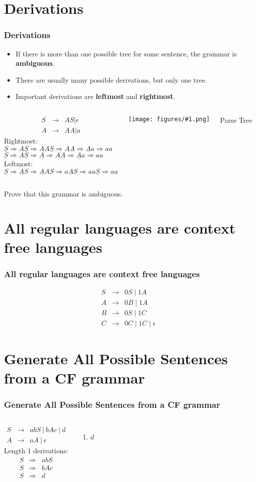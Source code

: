 \documentclass{beamer}
\newcommand{\myfig}[1]{\centerline{\texttt{[image: figures/\#1.png]}}}
\newcommand{\arr}{&\rightarrow&}
\newcommand{\darr}{&\Rightarrow&}
\newcommand{\dar}{\Rightarrow}
\newcommand{\bee}{\begin{eqnarray*}}
\newcommand{\eee}{\end{eqnarray*}}
\newcommand{\emptystring}{\ensuremath{\epsilon}}
\newcommand{\bi}{\begin{itemize}}
\newcommand{\li}{\item}
\newcommand{\ei}{\end{itemize}}
\newcommand{\sect}[1]{
\section{#1}
\begin{frame}[fragile]\frametitle{#1}
}
\begin{document}
\newcommand{\ul}[1]{\underline{#1}}
\sect{Derivations}
\bi
\li If there is more than one possible tree for some sentence, 
the grammar is {\bf ambiguous}.
\li There are usually many possible derivations, but only one tree.
\li Important derivations are {\bf leftmost} and {\bf rightmost}.
\ei
\begin{columns}
\bee
S \arr AS | \emptystring \\
A \arr AA | a
\eee
Rightmost:\\
\(
\ul{S} \dar A\ul{S} \dar AA\ul{S} \dar A\ul{A} \dar \ul{A}a \dar aa
\)\\
\(
\ul{S} \dar A\ul{S} \dar \ul{A} \dar A\ul{A} \dar \ul{A}a \dar aa
\)\\
Leftmost:\\
\(
\ul{S} \dar \ul{A}S \dar \ul{A}AS \dar a\ul{A}S \dar aa\ul{S} \dar aa
\)

\myfig{derivationtree}

\centerline{Parse Tree}

\end{columns}
\bigskip
\centerline{Prove that this grammar is ambiguous.}
\end{frame}

\sect{All regular languages are context free languages}
\bee
S \arr 0S \mid 1A \\
A \arr 0B \mid 1A \\
B \arr 0S \mid 1C \\
C \arr 0C \mid 1C \mid \epsilon
\eee

\end{frame}

\sect{Generate All Possible Sentences from a CF grammar}
\begin{columns}
\bee
S \arr abS \ | \ bAc \ | \ d\\
A \arr aA \ | \ \emptystring
\eee
{}
Length 1 derivations:
\bee
S \darr abS\\
S \darr bAc\\
S \darr d\\
\eee
{}
\begin{enumerate}
\item $d$
\end{enumerate}
\end{columns}
\end{frame}
\end{document}

